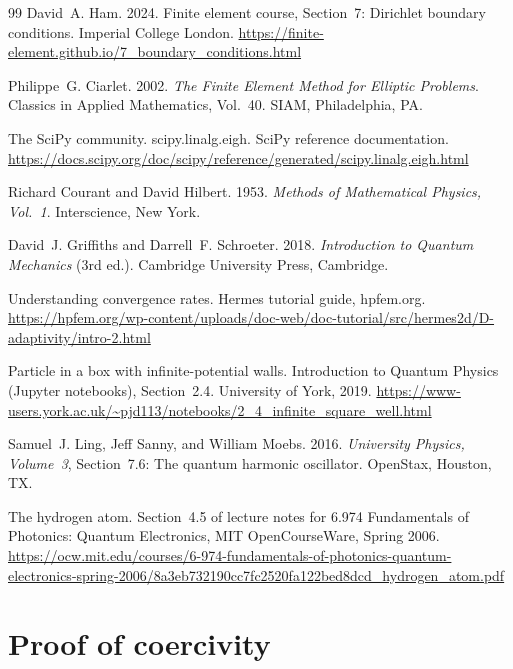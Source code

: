 \documentclass[acmsmall,screen]{MapleTrans}
\begin{document}
\begin{thebibliography}{99}
 David~A. Ham. 2024. Finite element course, Section~7: Dirichlet boundary conditions. Imperial College London. \url{https://finite-element.github.io/7_boundary_conditions.html}

 Philippe~G. Ciarlet. 2002. \textit{The Finite Element Method for Elliptic Problems}. Classics in Applied Mathematics, Vol.~40. SIAM, Philadelphia, PA.

 The SciPy community. scipy.linalg.eigh. SciPy reference documentation. \url{https://docs.scipy.org/doc/scipy/reference/generated/scipy.linalg.eigh.html}

 Richard Courant and David Hilbert. 1953. \textit{Methods of Mathematical Physics, Vol.~1}. Interscience, New York.

 David~J. Griffiths and Darrell~F. Schroeter. 2018. \textit{Introduction to Quantum Mechanics} (3rd ed.). Cambridge University Press, Cambridge.

 Understanding convergence rates. Hermes tutorial guide, hpfem.org. \url{https://hpfem.org/wp-content/uploads/doc-web/doc-tutorial/src/hermes2d/D-adaptivity/intro-2.html}

 Particle in a box with infinite-potential walls. Introduction to Quantum Physics (Jupyter notebooks), Section~2.4. University of York, 2019. \url{https://www-users.york.ac.uk/~pjd113/notebooks/2_4_infinite_square_well.html}

 Samuel~J. Ling, Jeff Sanny, and William Moebs. 2016. \textit{University Physics, Volume~3}, Section~7.6: The quantum harmonic oscillator. OpenStax, Houston, TX.

 The hydrogen atom. Section~4.5 of lecture notes for 6.974 Fundamentals of Photonics: Quantum Electronics, MIT OpenCourseWare, Spring 2006. \url{https://ocw.mit.edu/courses/6-974-fundamentals-of-photonics-quantum-electronics-spring-2006/8a3eb732190cc7fc2520fa122bed8dcd_hydrogen_atom.pdf}

\end{thebibliography}

\appendix

\section{Proof of coercivity} \label{sec:proof of coercivity}
\end{document}
